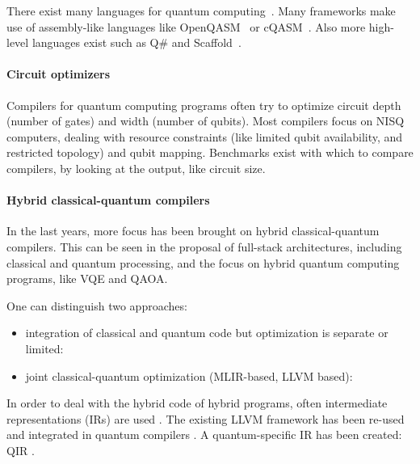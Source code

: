 There exist many languages for quantum computing~\cite{chong_programming_2017, heim_quantum_2020}.
Many frameworks make use of assembly-like languages like OpenQASM~\cite{cross_open_2017} or cQASM~\cite{khammassi_cqasm_2018}.
Also more high-level languages exist such as Q\# and Scaffold~\cite{svore_q_2018, litteken_updated_2020, heim_quantum_2020}.

\paragraph{Circuit optimizers}
Compilers for quantum computing programs often try to optimize circuit depth (number of gates) and width (number of qubits).
Most compilers focus on \ac{NISQ} computers, dealing with resource constraints (like limited qubit availability, and restricted topology)\cite{chong_programming_2017, murali_full-stack_2019, bandic_full-stack_2022} and qubit mapping\cite{li_tackling_2019, zhang_context-sensitive_2020, bandic_mapping_2023, nishio_extracting_2020}.
Benchmarks exist with which to compare compilers, by looking at the output, like circuit size.

\paragraph{Hybrid classical-quantum compilers}
In the last years, more focus has been brought on hybrid classical-quantum compilers.
This can be seen in the proposal of full-stack architectures, including classical and quantum processing\cite{murali_full-stack_2019, khammassi_openql_2021, mccaskey_xacc_2020}, and the focus on hybrid quantum computing programs, like VQE and QAOA. 

One can distinguish two approaches:
\begin{itemize}
\item integration of classical and quantum code but optimization is separate or limited: \cite{litteken_updated_2020, fux_quingo_2021, khalate_llvm-based_2022, younis_quantum_2022}
\item joint classical-quantum optimization (MLIR-based, LLVM based): \cite{mccaskey_mlir_2021, ittah_enabling_2022, nguyen_retargetable_2022, peduri_qssa_2022}
\end{itemize}

In order to deal with the hybrid code of hybrid programs, often intermediate representations (IRs) are used \cite{nigam_compiler_2021, nishio_inquir_2023}.
The existing LLVM framework has been re-used and integrated in quantum compilers \cite{murali_noise-adaptive_2019, murali_full-stack_2019, litteken_updated_2020}.
A quantum-specific IR has been created: QIR \cite{haner_software_2018, geller_introducing_2020}.

